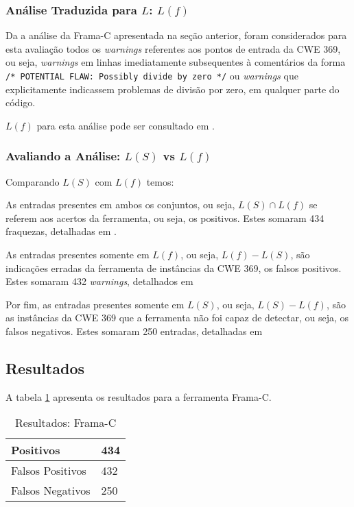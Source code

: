   \subsubsection{Análise Traduzida para $L$: $L(f)$}

  Da a análise da Frama-C apresentada na seção anterior, foram considerados para esta avaliação todos os \textit{warnings} referentes aos pontos de entrada da CWE 369, ou seja, \textit{warnings} em linhas imediatamente subsequentes à comentários da forma
  \lstinline{/* POTENTIAL FLAW: Possibly divide by zero */}
  ou \textit{warnings} que explicitamente indicassem problemas de divisão por zero, em qualquer parte do código.

  $L(f)$ para esta análise pode ser consultado em .

  \subsubsection{Avaliando a Análise: $L(S)$ vs $L(f)$}

  Comparando $L(S)$ com $L(f)$ temos:

  As entradas presentes em ambos os conjuntos, ou seja, $L(S) \cap L(f)$ se referem aos acertos da ferramenta, ou seja, os positivos. Estes somaram 434 fraquezas, detalhadas em .

  As entradas presentes somente em $L(f)$, ou seja, $L(f) - L(S)$, são indicações erradas da ferramenta de instâncias da CWE 369, os falsos positivos. Estes somaram 432 \textit{warnings}, detalhados em 

  Por fim, as entradas presentes somente em $L(S)$, ou seja, $L(S) - L(f)$, são as instâncias da CWE 369 que a ferramenta não foi capaz de detectar, ou seja, os falsos negativos. Estes somaram 250 entradas, detalhadas em 

  \subsection{Resultados}

A tabela \ref{tabela_framac1} apresenta os resultados para a ferramenta Frama-C.
\begin{table}[h]
  \centering
\begin{tabular}{| l | l |}
  \hline
  Positivos & 434 \\ \hline
  Falsos Positivos & 432 \\ \hline
  Falsos Negativos & 250 \\
  \hline
\end{tabular}
\caption{Resultados: Frama-C}
\label{tabela_framac1}
\end{table}

